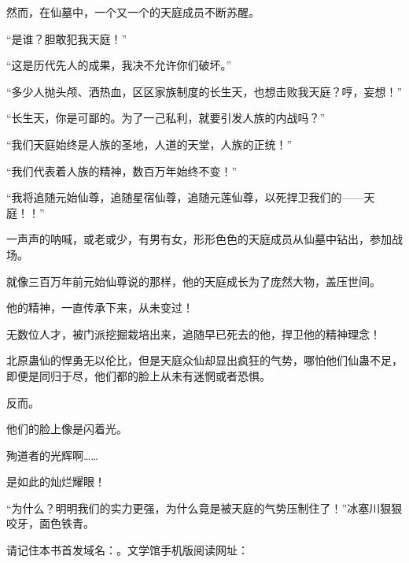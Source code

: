 \begin{this_body}
然而，在仙墓中，一个又一个的天庭成员不断苏醒。

“是谁？胆敢犯我天庭！”

“这是历代先人的成果，我决不允许你们破坏。”

“多少人抛头颅、洒热血，区区家族制度的长生天，也想击败我天庭？哼，妄想！”

“长生天，你是可鄙的。为了一己私利，就要引发人族的内战吗？”

“我们天庭始终是人族的圣地，人道的天堂，人族的正统！”

“我们代表着人族的精神，数百万年始终不变！”

“我将追随元始仙尊，追随星宿仙尊，追随元莲仙尊，以死捍卫我们的——天庭！！”

一声声的呐喊，或老或少，有男有女，形形色色的天庭成员从仙墓中钻出，参加战场。

就像三百万年前元始仙尊说的那样，他的天庭成长为了庞然大物，盖压世间。

他的精神，一直传承下来，从未变过！

无数位人才，被门派挖掘栽培出来，追随早已死去的他，捍卫他的精神理念！

北原蛊仙的悍勇无以伦比，但是天庭众仙却显出疯狂的气势，哪怕他们仙蛊不足，即便是同归于尽，他们都的脸上从未有迷惘或者恐惧。

反而。

他们的脸上像是闪着光。

殉道者的光辉啊……

是如此的灿烂耀眼！

“为什么？明明我们的实力更强，为什么竟是被天庭的气势压制住了！”冰塞川狠狠咬牙，面色铁青。

请记住本书首发域名：。文学馆手机版阅读网址：

\end{this_body}

